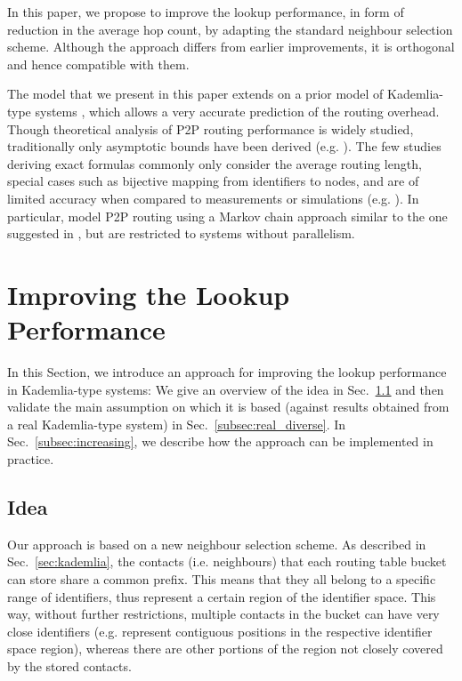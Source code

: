 \documentclass[10pt, conference, compsocconf, letterpaper]{IEEEtran}
\begin{document}
In this paper, we propose to improve the lookup performance, in form of reduction in the average hop count, by adapting the standard neighbour selection scheme. Although the approach differs from earlier improvements, it is orthogonal and hence compatible with them. 
 
The model that we present in this paper extends on a prior model of Kademlia-type systems \cite{roos13comprehending}, which allows a very accurate prediction of the routing overhead.
Though theoretical analysis of P2P routing performance is widely studied, traditionally only asymptotic bounds have been derived (e.g. \cite{stoica2001chord,rowstron2001pastry, Maymounkov02Kademlia,malkhi2002viceroy}).
The few studies deriving exact formulas commonly only consider the average routing length, special cases such as bijective mapping from identifiers to nodes, and are of limited accuracy when compared to measurements or simulations (e.g.
\cite{stutzbach06improving,spognardi2006formal, rai2007performance}).
In particular, \cite{spognardi2006formal, rai2007performance} model P2P routing using a Markov chain approach similar to 
the one suggested in \cite{roos13comprehending}, but are restricted to systems without parallelism.



\section{Improving the Lookup Performance} \label{sec:solution}

In this Section, we introduce an approach for improving the lookup performance in Kademlia-type systems: We give an overview of the idea in Sec.~\ref{subsec:idea} and then validate the main assumption on which it is based (against results obtained from a real Kademlia-type system) in Sec.~\ref{subsec:real_diverse}. In Sec.~\ref{subsec:increasing}, we describe how the approach can be implemented in practice. 

\subsection{Idea} \label{subsec:idea}

Our approach is based on a new neighbour selection scheme. As described in Sec.~\ref{sec:kademlia}, the  contacts (i.e. neighbours) that each routing table bucket can store share a common prefix. This means that they all belong to a specific range of identifiers, thus represent a certain region of the identifier space. 
This way, without further restrictions, multiple contacts in the bucket can have very close identifiers (e.g. represent contiguous positions in the respective identifier space region), whereas there are other portions of the region not closely covered by the stored contacts.
\end{document}

